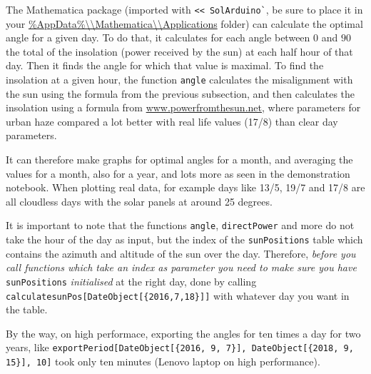 \documentclass{article}
\begin{document}
    The Mathematica package (imported with \verb|<< SolArduino`|, be sure to place it in your
    \url{\%AppData\%\\Mathematica\\Applications} folder) can calculate the optimal angle for a given day.
    To do that, it calculates for each angle between $0$ and $90$ the total of the insolation (power received by the sun) at each half hour of that day.
    Then it finds the angle for which that value is maximal.
    To find the insolation at a given hour, the function \verb|angle| calculates the misalignment with the sun using the formula from the previous subsection, and then calculates the insolation using a formula from \href{http://www.powerfromthesun.net/Book/chapter02/chapter02.html#ZEqnNum929295 }{www.powerfromthesun.net}, where parameters for urban haze compared a lot better with real life values (17/8) than clear day parameters.

    It can therefore make graphs for optimal angles for a month, and averaging the values for a month, also for a year, and lots more as seen in the demonstration notebook.
    When plotting real data, for example days like 13/5, 19/7 and 17/8 are all cloudless days with the solar panels at around 25 degrees.

    It is important to note that the functions \verb|angle|, \verb|directPower| and more do not take the hour of the day as input, but the index of the \verb|sunPositions| table which contains the azimuth and altitude of the sun over the day.
    Therefore, \textit{before you call functions which take an index as parameter you need to make sure you have }\verb|sunPositions| \textit{initialised} at the right day, done by calling \verb|calculatesunPos[DateObject[{2016,7,18}]]| with whatever day you want in the table.

    By the way, on high performace, exporting the angles for ten times a day for two years, like  \verb|exportPeriod[DateObject[{2016, 9, 7}], DateObject[{2018, 9, 15}], 10]| took only ten minutes (Lenovo laptop on high performance).
\end{document}
